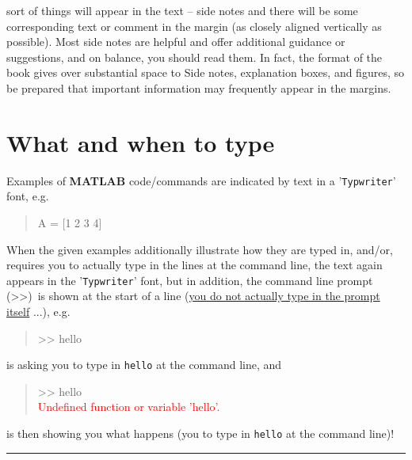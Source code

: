 \documentclass{tufte-book} %
\newenvironment{docspec}{\begin{quotation}\ttfamily\parskip0pt\parindent0pt\ignorespaces}{\end{quotation}}
\begin{document}
 sort of things will appear in the text -- side notes and there will be some corresponding text or comment in the margin (as closely aligned vertically as possible). Most side notes are helpful and offer additional guidance or suggestions, and on balance, you should read them. In fact, the format of the book gives over substantial space to Side notes, explanation boxes, and figures, so be prepared that important information may frequently appear in the margins.


\section{What and when to type}

Examples of \textbf{MATLAB} code/commands are indicated by text in a '\texttt{Typwriter}' font, e.g.

\begin{docspec}
A = [1 2 3 4]
\end{docspec}  

\noindent When the given examples additionally illustrate how they are typed in, and/or, requires you to actually type in the lines at the command line, the text  again appears in the '\texttt{Typwriter}' font, but in addition, the command line prompt (\textgreater\textgreater)\ is shown at the start of a line (\uline{you do not actually type in the prompt itself} ...), e.g.

\begin{docspec}
>> hello
\end{docspec}  

is asking you to type in \texttt{hello} at the command line, and

\begin{docspec}
>> hello\\
\textcolor{red}{Undefined function or variable 'hello'.}\\
\end{docspec}  

is then showing you what happens (you to type in \texttt{hello} at the command line)!

\vspace{1mm}
\noindent\rule{4cm}{0.5pt}
\vspace{2mm}
\end{document}
